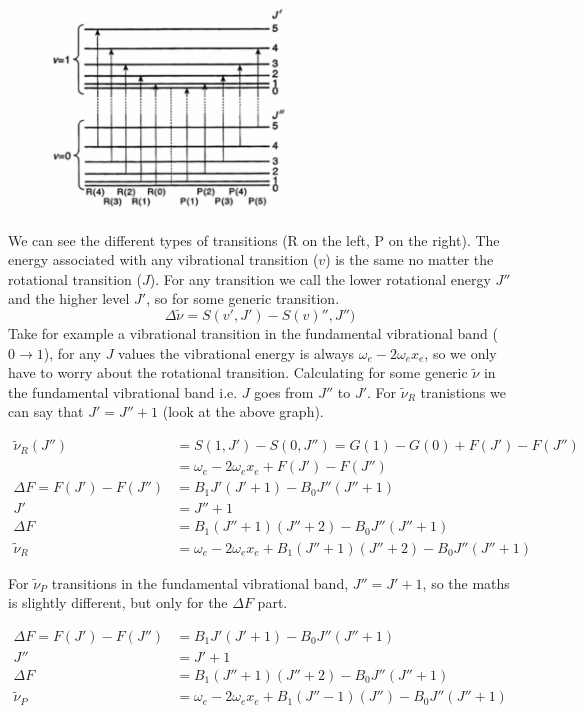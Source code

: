 \documentclass{article}
\begin{document}
    \begin{figure}[h]
        \centering
        \includegraphics[width=6.5cm]{vj.png}
    \end{figure}

    We can see the different types of transitions (R on the left, P on the right). The energy associated with any
    vibrational transition ($v$) is the same no matter the rotational transition ($J$). For any transition we call 
    the lower rotational energy $J''$ and the higher level $J'$, so for some generic transition.
    $$\Delta \tilde{\nu} = S(v', J') - S(v)'', J'')$$
    Take for example a vibrational transition in the fundamental vibrational band ($0 \rightarrow 1$), for any 
    $J$ values the vibrational energy is always $\omega_e - 2\omega_e x_e$, so we only have to worry about the rotational
    transition. Calculating for some generic $\tilde{\nu}$ in the fundamental vibrational band i.e. $J$ goes 
    from $J''$ to $J'$. For $\tilde{\nu}_R$ tranistions we can say that $J' = J'' + 1$ (look at the above graph).

    \begin{align*}
        \tilde{\nu}_R (J'') &= S(1, J') - S(0, J'') = G(1) - G(0) + F(J') - F(J'') \\
        &= \omega_e - 2\omega_e x_e + F(J') - F(J'')\\
        \Delta F = F(J') - F(J'') &= B_1J'(J'+1) - B_0J''(J'' + 1)\\
        J' &= J'' + 1\\
        \Delta F &= B_1(J''+1)(J''+2) - B_0J''(J''+1)\\
        \tilde{\nu}_R &= \omega_e - 2\omega_e x_e + B_1(J''+1)(J''+2) - B_0J''(J''+1)
    \end{align*}

    For $\tilde{\nu}_P$ transitions in the fundamental vibrational band, $J'' = J'+1$, so the maths is slightly different,
    but only for the $\Delta F$ part.

    \begin{align*}
        \Delta F = F(J') - F(J'') &= B_1J'(J'+1) - B_0J''(J'' + 1)\\
        J'' &= J' + 1\\
        \Delta F &= B_1(J''+1)(J''+2) - B_0J''(J''+1)\\
        \tilde{\nu}_P &= \omega_e - 2\omega_e x_e + B_1(J''-1)(J'') - B_0J''(J''+1)
    \end{align*}
\end{document}
